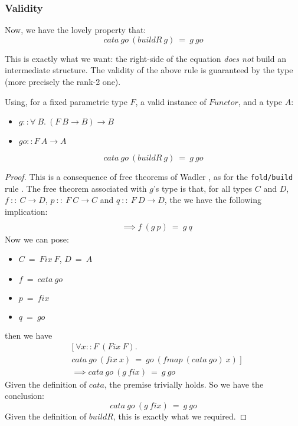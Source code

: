 \subsubsection{Validity}
Now, we have the lovely property that:
$$cata\ go\ (buildR\ g)\ =\ g\ go$$

This is exactly what we want: the right-side of the equation \emph{does not} build an intermediate structure. The validity of the above rule is guaranteed by the type (more precisely the rank-2 one).

\begin{theorem}
Using, for a fixed parametric type $F$, a valid instance of $Functor$, and a type $A$:
\begin{itemize}
	\item $g :: \forall\ B.\ (F\ B \to B) \to B$
	\item $go :: F\ A \to A $
\end{itemize}
$$cata\ go\ (buildR\ g)\ =\ g\ go$$
\end{theorem}
\begin{proof}
This is a consequence of free theorems of Wadler \cite{Wadler:1989:TF:99370.99404}, as for the \verb|fold/build| rule \cite{Gill:1993:SCD:165180.165214}. The free theorem associated with $g$'s type is that, for all types $C$ and $D$, $f\ ::\ C \to D$, $p\ ::\ F\ C \to C$ and $q\ ::\ F\ D \to D$, the we have the following implication:
\begin{align*}
[\ \forall& x::C.\ f\ (p\ x)\ =\ q\ (fmap\ f\ x)\ ]\\
&\implies f\ (g\ p)\ =\ g\ q
\end{align*}
Now we can pose:
\begin{itemize}
	\item $C\ =\ Fix\ F$, $D\ =\ A$
	\item $f\ =\ cata\ go$
	\item $p\ =\ fix$
	\item $q\ =\ go$
\end{itemize}
then we have
\begin{align*}
&[\ \forall x::F\ (Fix\ F).\\
&cata\ go\ (fix\ x)\ =\ go\ (fmap\ (cata\ go)\ x)\ ]\\
&\implies cata\ go\ (g\ fix)\ =\ g\ go
\end{align*}
Given the definition of $cata$, the premise trivially holds. So we have the conclusion:
$$cata\ go\ (g\ fix)\ =\ g\ go$$
Given the definition of $buildR$, this is exactly what we required.
\end{proof}
